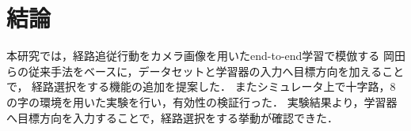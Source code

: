 \chapter{結論}

本研究では，経路追従行動をカメラ画像を用いたend-to-end学習で模倣する
岡田ら\cite{okada}の従来手法をベースに，データセットと学習器の入力へ目標方向を加えることで，
経路選択をする機能の追加を提案した．
またシミュレータ上で十字路，8の字の環境を用いた実験を行い，有効性の検証行った．
実験結果より，学習器へ目標方向を入力することで，経路選択をする挙動が確認できた．